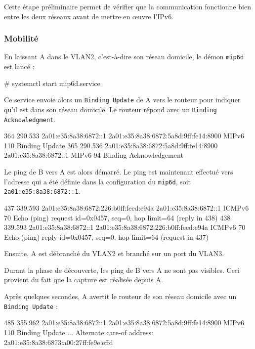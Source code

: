 Cette étape préliminaire permet de vérifier que la communication fonctionne bien entre les deux réseaux avant de mettre en œuvre l'IPv6.

\subsubsection{Mobilité}

En laissant A dans le VLAN2, c'est-à-dire son réseau domicile, le démon \texttt{mip6d} est lancé :

\begin{code}
# systemctl start mip6d.service
\end{code}

Ce service envoie alors un \texttt{Binding Update} de A vers le routeur pour indiquer qu'il est dans son réseau domicile.
Le routeur répond avec un \texttt{Binding Acknowledgment}.

\begin{paquet}
364	290.533	2a01:e35:8a38:6872::1	2a01:e35:8a38:6872:5a8d:9ff:fe14:8900	MIPv6	110	Binding Update
365	290.536	2a01:e35:8a38:6872:5a8d:9ff:fe14:8900	2a01:e35:8a38:6872::1	MIPv6	94	Binding Acknowledgement
\end{paquet}

Le ping de B vers A est alors démarré.
Le ping est maintenant effectué vers l'adresse qui a été définie dans la configuration du \texttt{mip6d}, soit \texttt{	2a01:e35:8a38:6872::1}.

\begin{paquet}
437	339.593	2a01:e35:8a38:6872:226:b0ff:feed:e94a	2a01:e35:8a38:6872::1	ICMPv6	70	Echo (ping) request id=0x0457, seq=0, hop limit=64 (reply in 438)
438	339.593	2a01:e35:8a38:6872::1	2a01:e35:8a38:6872:226:b0ff:feed:e94a	ICMPv6	70	Echo (ping) reply id=0x0457, seq=0, hop limit=64 (request in 437)
\end{paquet}

Ensuite, A est débranché du VLAN2 et branché sur un port du VLAN3.

\begin{warning}
Durant la phase de découverte, les ping de B vers A ne sont pas visibles.
Ceci provient du fait que la capture est réalisée depuis A.
\end{warning}

Après quelques secondes, A avertit le routeur de son réseau domicile avec un \texttt{Binding Update} :

\begin{paquet}
485	355.962	2a01:e35:8a38:6872::1	2a01:e35:8a38:6872:5a8d:9ff:fe14:8900	MIPv6	110	Binding Update
...
    Alternate care-of address: 2a01:e35:8a38:6873:a00:27ff:fe9e:effd
\end{paquet}

